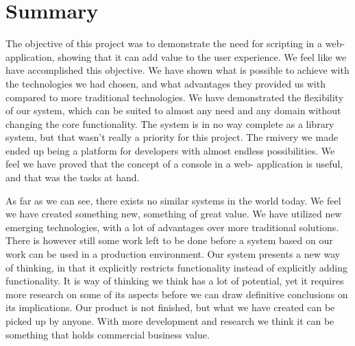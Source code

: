 \section{Summary}
The objective of this project was to demonstrate the need for scripting in a web- application, showing that it can add value to the user experience. We feel like we have accomplished this objective. We have shown what is possible to achieve with the technologies we had chosen, and what advantages they provided us with compared to more traditional technologies. We have demonstrated the flexibility of our system, which can be suited to almost any need and any domain without changing the core functionality. The system is in no way complete as a library system, but that wasn’t really a priority for this project. The rmivery we made ended up being a platform for developers with almost endless possibilities. We feel we have proved that the concept of a console in a web- application is useful, and that was the tasks at hand.

As far as we can see, there exists no similar systems in the world today. We feel we have created something new, something of great value. We have utilized new emerging technologies, with a lot of advantages over more traditional solutions. There is however still some work left to be done before a system based on our work can be used in a production environment. Our system presents a new way of thinking, in that it explicitly restricts functionality instead of explicitly adding functionality. It is way of thinking we think has a lot of potential, yet it requires more research on some of its aspects before we can draw definitive conclusions on its implications. Our product is not finished, but what we have created can be picked up by anyone. With more development and research we think it can be something that holds commercial business value.


